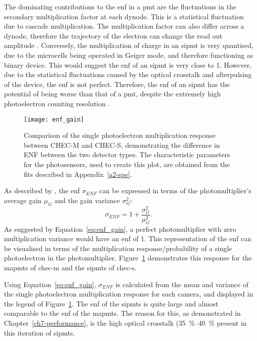 The dominating contributions to the \gls{enf} in a \gls{pmt} are the fluctuations in the secondary multiplication factor at each dynode. This is a statistical fluctuation due to cascade multiplication. The multiplication factor can also differ across a dynode, therefore the trajectory of the electron can change the read out amplitude \cite{HAMAMATSU2007}. Conversely, the multiplication of charge in an \gls{sipmt} is very quantised, due to the microcells being operated in Geiger mode, and therefore functioning as binary device. This would suggest the \gls{enf} of an \gls{sipmt} is very close to 1. However, due to the statistical fluctuations caused by the optical crosstalk and afterpulsing of the device, the \gls{enf} is not perfect. Therefore, the \gls{enf} of an \gls{sipmt} has the potential of being worse than that of a \gls{pmt}, despite the extremely high photoelectron counting resolution \cite{Vinogradov2012}.

\begin{figure}
	\centering
    \texttt{[image: enf\_gain]} 
	\caption[Comparison of the single photoelectron multiplication response between CHEC-M and CHEC-S.]{Comparison of the single photoelectron multiplication response between CHEC-M and CHEC-S, demonstrating the difference in ENF between the two detector types. The characteristic parameters for the photosensors, used to create this plot, are obtained from the fits described in Appendix~\ref{a2-spe}.}
	\label{fig:enf_gain}
\end{figure}

As described by \textcite{Teich1986}, the \gls{enf} $\sigma_{ENF}$ can be expressed in terms of the photomultiplier's average gain $\mu_G$ and the gain variance $\sigma_G^2$:
\begin{equation} \label{eq:enf_gain}
\sigma_{ENF} = 1 + \frac{\sigma_G^2}{\mu_G^2}.
\end{equation}
As suggested by Equation~\ref{eq:enf_gain}, a perfect photomultiplier with zero multiplication variance would have an \gls{enf} of 1. This representation of the \gls{enf} can be visualised in terms of the multiplication response/probability of a single photoelectron in the photomultiplier. Figure~\ref{fig:enf_gain} demonstrates this response for the \glspl{mapmt} of \gls{chec-m} and the \glspl{sipmt} of \gls{chec-s}. 

Using Equation~\ref{eq:enf_gain}, $\sigma_{ENF}$ is calculated from the mean and variance of the single photoelectron multiplication response for each camera, and displayed in the legend of Figure~\ref{fig:enf_gain}. The \gls{enf} of the \glspl{sipmt} is quite large and almost comparable to the \gls{enf} of the \glspl{mapmt}. The reason for this, as demonstrated in Chapter~\ref{ch7-performance}, is the high optical crosstalk (\SIrange{35}{40}{\percent} present in this iteration of \glspl{sipmt}.

